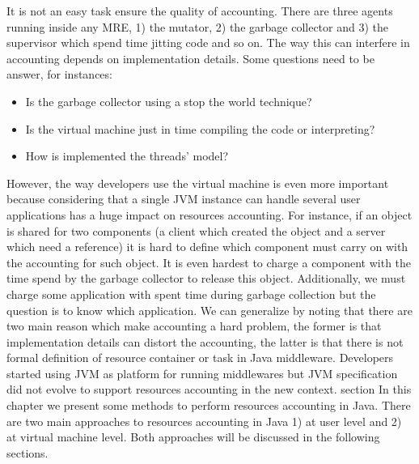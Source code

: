 It is not an easy task ensure the quality of accounting. There are three agents running inside any MRE, 1) the mutator, 2) the garbage collector and 3) the supervisor which spend time jitting code and so on. The way this can interfere in accounting depends on implementation details. Some questions need to be answer, for instances:
\begin{itemize}
\item Is the garbage collector using a stop the world technique?
\item Is the virtual machine just in time compiling the code or interpreting?
\item How is implemented the threads' model?
\end{itemize}
However, the way developers use the virtual machine is even more important because considering that a single JVM instance can handle several user applications has a huge impact on resources accounting. For instance, if an object is shared for two components (a client which created the object and a server which need a reference) it is hard to define which component must carry on with the accounting for such object. It is even hardest to charge a component with the time spend by the garbage collector to release this object. Additionally, we must charge some application with spent time during garbage collection but the question is to know which application. We can generalize by noting that there are two main reason which make accounting a hard problem, the former is that implementation details can distort the accounting, the latter is that there is not formal definition of resource container or task in Java middleware. Developers started using JVM as platform for running middlewares but JVM specification did not evolve to support resources accounting in the new context.
section
In this chapter we present some methods to perform resources accounting in Java. There are two main approaches to resources accounting in Java 1) at user level and 2) at virtual machine level. Both approaches will be discussed in the following sections. 

